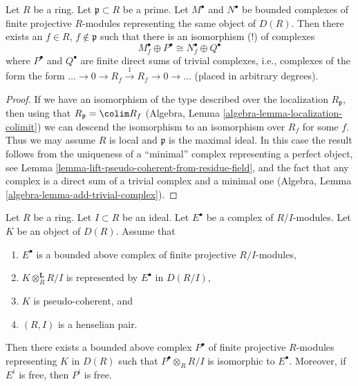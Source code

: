 \begin{lemma}
\label{lemma-compare-representatives-perfect}
Let $R$ be a ring. Let $\mathfrak p \subset R$ be a prime. Let $M^\bullet$
and $N^\bullet$ be bounded complexes of finite projective $R$-modules
representing the same object of $D(R)$. Then there exists an $f \in R$,
$f \not \in \mathfrak p$ such that there is an isomorphism (!)
of complexes
$$
M^\bullet_f \oplus P^\bullet \cong N^\bullet_f \oplus Q^\bullet
$$
where $P^\bullet$ and $Q^\bullet$ are finite direct sums of
trivial complexes, i.e., complexes of the form
the form $\ldots \to 0 \to R_f \xrightarrow{1} R_f \to 0 \to \ldots$
(placed in arbitrary degrees).
\end{lemma}

\begin{proof}
If we have an isomorphism of the type described over the localization
$R_\mathfrak p$, then using that $R_\mathfrak p = \colim R_f$
(Algebra, Lemma \ref{algebra-lemma-localization-colimit}) we can
descend the isomorphism to an isomorphism over $R_f$ for some $f$.
Thus we may assume $R$ is local and $\mathfrak p$ is the maximal ideal.
In this case the result follows from the uniqueness of a ``minimal''
complex representing a perfect object, see
Lemma \ref{lemma-lift-pseudo-coherent-from-residue-field}, and
the fact that any complex is a direct sum of a trivial complex
and a minimal one (Algebra, Lemma \ref{algebra-lemma-add-trivial-complex}).
\end{proof}

\begin{lemma}
\label{lemma-lift-complex-finite-projectives}
Let $R$ be a ring. Let $I \subset R$ be an ideal. Let $E^\bullet$
be a complex of $R/I$-modules. Let $K$ be an object of $D(R)$. Assume that
\begin{enumerate}
\item $E^\bullet$ is a bounded above complex of finite projective $R/I$-modules,
\item $K \otimes_R^\mathbf{L} R/I$ is represented by $E^\bullet$ in $D(R/I)$,
\item $K$ is pseudo-coherent, and
\item $(R, I)$ is a henselian pair.
\end{enumerate}
Then there exists a bounded above complex $P^\bullet$ of finite projective
$R$-modules representing $K$ in $D(R)$ such that $P^\bullet \otimes_R R/I$
is isomorphic to $E^\bullet$. Moreover, if $E^i$ is free, then $P^i$ is free.
\end{lemma}

